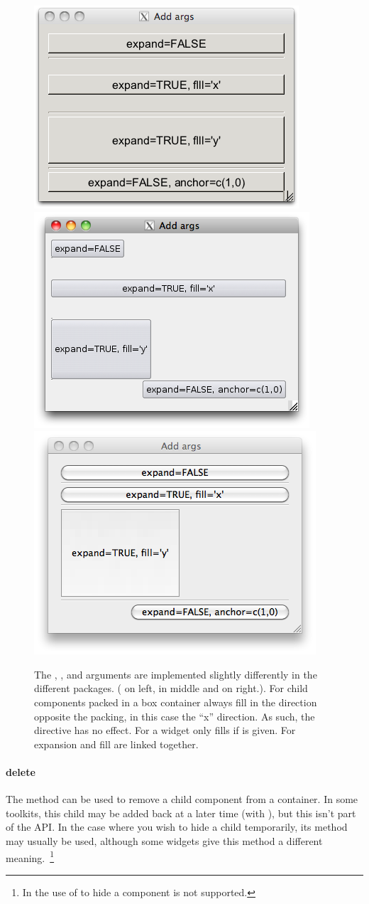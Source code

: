 \begin{figure}
  \centering
  \includegraphics[width=.3\textwidth]{fig-gWidgets-expand-RGtk2.png}
  \includegraphics[width=.3\textwidth]{fig-gWidgets-expand-tcltk.png}
  \includegraphics[width=.3\textwidth]{fig-gWidgets-expand-Qt.png}
  \caption{
    The , , and  arguments are
    implemented slightly differently in the different
    packages. ( on left,  in
    middle and  on right.). For \GTK\/ child
    components packed in a box container always fill in the direction
    opposite the packing, in this case the ``x'' direction. As such,
    the  directive has no effect. For
     a widget only fills if  is given.
    For  expansion and fill are linked together.
  }
  \label{fig:gWidgets-ggroup-expand-fill-anchor}
\end{figure}


\paragraph{delete}
The  method can be used to remove a child
component from a container. In some toolkits, this child may be added
back at a later time (with ), but this isn't part
of the API. In the case where you wish to hide a child temporarily,
its  method may usually be used, although some
widgets give this method a different meaning.~\footnote{In
   the use of  to hide a
  component is not supported.}





